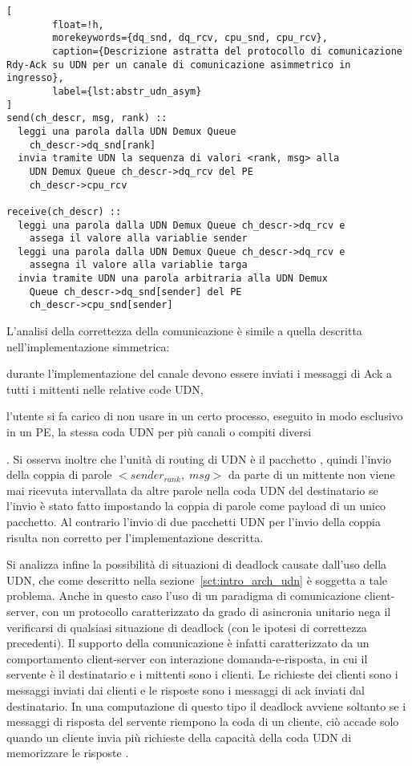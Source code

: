 \begin{lstlisting}[
        float=!h,
        morekeywords={dq_snd, dq_rcv, cpu_snd, cpu_rcv}, 
        caption={Descrizione astratta del protocollo di comunicazione Rdy-Ack su UDN per un canale di comunicazione asimmetrico in ingresso},
        label={lst:abstr_udn_asym}
]
send(ch_descr, msg, rank) ::
  leggi una parola dalla UDN Demux Queue 
    ch_descr->dq_snd[rank]
  invia tramite UDN la sequenza di valori <rank, msg> alla
    UDN Demux Queue ch_descr->dq_rcv del PE
    ch_descr->cpu_rcv

receive(ch_descr) ::
  leggi una parola dalla UDN Demux Queue ch_descr->dq_rcv e
    assega il valore alla variablie sender
  leggi una parola dalla UDN Demux Queue ch_descr->dq_rcv e
    assegna il valore alla variablie targa
  invia tramite UDN una parola arbitraria alla UDN Demux
    Queue ch_descr->dq_snd[sender] del PE 
    ch_descr->cpu_snd[sender]
\end{lstlisting}

L'analisi della correttezza della comunicazione \`e simile a quella descritta nell'implementazione simmetrica: \begin{inparaenum} \item durante l'implementazione del canale devono essere inviati i messaggi di Ack a tutti i mittenti nelle relative code UDN, \item l'utente si fa carico di non usare in un certo processo, eseguito in modo esclusivo in un PE, la stessa coda UDN per pi\`u canali o compiti diversi\end{inparaenum}. Si osserva inoltre che l'unit\`a di routing di UDN \`e il pacchetto \cite{ug101}, quindi l'invio della coppia di parole $<sender_{rank},\;msg>$ da parte di un mittente non viene mai ricevuta intervallata da altre parole nella coda UDN del destinatario se l'invio \`e stato fatto impostando la coppia di parole come payload di un unico pacchetto. Al contrario l'invio di due pacchetti UDN per l'invio della coppia risulta non corretto per l'implementazione descritta.

Si analizza infine la possibilit\`a di situazioni di deadlock causate dall'uso della UDN, che come descritto nella sezione~\ref{sct:intro_arch_udn} \`e soggetta a tale problema. Anche in questo caso l'uso di un paradigma di comunicazione client-server, con un protocollo caratterizzato da grado di asincronia unitario nega il verificarsi di qualsiasi situazione di deadlock (con le ipotesi di correttezza precedenti). Il supporto della comunicazione \`e infatti caratterizzato da un comportamento client-server con interazione domanda-e-risposta, in cui il servente \`e il destinatario e i mittenti sono i clienti. Le richieste dei clienti sono i messaggi inviati dai clienti e le risposte sono i messaggi di ack inviati dal destinatario. In una computazione di questo tipo il deadlock avviene soltanto se i messaggi di risposta del servente riempono la coda di un cliente, ci\`o accade solo quando un cliente invia pi\`u richieste della capacit\`a della coda UDN di memorizzare le risposte \cite{ug205}.

